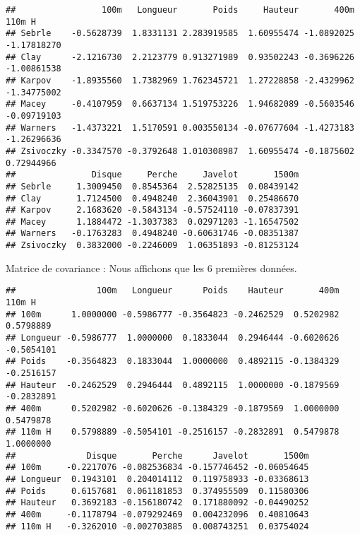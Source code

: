 \documentclass[
]{article}
\newenvironment{Shaded}{\begin{snugshade}}{\end{snugshade}}
\newcommand{\FunctionTok}[1]{\textcolor[rgb]{0.00,0.00,0.00}{#1}}
\newcommand{\NormalTok}[1]{#1}
\newcommand{\SpecialCharTok}[1]{\textcolor[rgb]{0.00,0.00,0.00}{#1}}
\begin{document}
\begin{verbatim}
##                 100m   Longueur       Poids     Hauteur       400m      110m H
## Sebrle    -0.5628739  1.8331131 2.283919585  1.60955474 -1.0892025 -1.17818270
## Clay      -2.1216730  2.2123779 0.913271989  0.93502243 -0.3696226 -1.00861538
## Karpov    -1.8935560  1.7382969 1.762345721  1.27228858 -2.4329962 -1.34775002
## Macey     -0.4107959  0.6637134 1.519753226  1.94682089 -0.5603546 -0.09719103
## Warners   -1.4373221  1.5170591 0.003550134 -0.07677604 -1.4273183 -1.26296636
## Zsivoczky -0.3347570 -0.3792648 1.010308987  1.60955474 -0.1875602  0.72944966
##               Disque     Perche     Javelot       1500m
## Sebrle     1.3009450  0.8545364  2.52825135  0.08439142
## Clay       1.7124500  0.4948240  2.36043901  0.25486670
## Karpov     2.1683620 -0.5843134 -0.57524110 -0.07837391
## Macey      1.1884472 -1.3037383  0.02971203 -1.16547502
## Warners   -0.1763283  0.4948240 -0.60631746 -0.08351387
## Zsivoczky  0.3832000 -0.2246009  1.06351893 -0.81253124
\end{verbatim}

Matrice de covariance : Nous affichons que les 6 premières données.

\begin{Shaded}
\end{Shaded}

\begin{verbatim}
##                100m   Longueur      Poids    Hauteur       400m     110m H
## 100m      1.0000000 -0.5986777 -0.3564823 -0.2462529  0.5202982  0.5798889
## Longueur -0.5986777  1.0000000  0.1833044  0.2946444 -0.6020626 -0.5054101
## Poids    -0.3564823  0.1833044  1.0000000  0.4892115 -0.1384329 -0.2516157
## Hauteur  -0.2462529  0.2946444  0.4892115  1.0000000 -0.1879569 -0.2832891
## 400m      0.5202982 -0.6020626 -0.1384329 -0.1879569  1.0000000  0.5479878
## 110m H    0.5798889 -0.5054101 -0.2516157 -0.2832891  0.5479878  1.0000000
##              Disque       Perche      Javelot       1500m
## 100m     -0.2217076 -0.082536834 -0.157746452 -0.06054645
## Longueur  0.1943101  0.204014112  0.119758933 -0.03368613
## Poids     0.6157681  0.061181853  0.374955509  0.11580306
## Hauteur   0.3692183 -0.156180742  0.171880092 -0.04490252
## 400m     -0.1178794 -0.079292469  0.004232096  0.40810643
## 110m H   -0.3262010 -0.002703885  0.008743251  0.03754024
\end{verbatim}
\end{document}
